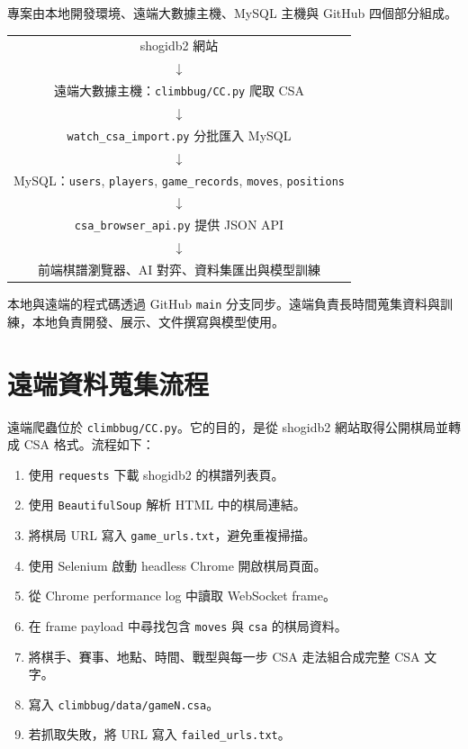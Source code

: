 \documentclass[12pt,a4paper,fontset=none]{ctexart}
\begin{document}
專案由本地開發環境、遠端大數據主機、MySQL 主機與 GitHub 四個部分組成。

\begin{center}
\begin{tabular}{c}
shogidb2 網站 \\
$\downarrow$ \\
遠端大數據主機：\texttt{climbbug/CC.py} 爬取 CSA \\
$\downarrow$ \\
\texttt{watch\_csa\_import.py} 分批匯入 MySQL \\
$\downarrow$ \\
MySQL：\texttt{users}, \texttt{players}, \texttt{game\_records}, \texttt{moves}, \texttt{positions} \\
$\downarrow$ \\
\texttt{csa\_browser\_api.py} 提供 JSON API \\
$\downarrow$ \\
前端棋譜瀏覽器、AI 對弈、資料集匯出與模型訓練
\end{tabular}
\end{center}

本地與遠端的程式碼透過 GitHub \texttt{main} 分支同步。遠端負責長時間蒐集資料與訓練，本地負責開發、展示、文件撰寫與模型使用。

\section{遠端資料蒐集流程}

遠端爬蟲位於 \texttt{climbbug/CC.py}。它的目的，是從 shogidb2 網站取得公開棋局並轉成 CSA 格式。流程如下：

\begin{enumerate}
  \item 使用 \texttt{requests} 下載 shogidb2 的棋譜列表頁。
  \item 使用 \texttt{BeautifulSoup} 解析 HTML 中的棋局連結。
  \item 將棋局 URL 寫入 \texttt{game\_urls.txt}，避免重複掃描。
  \item 使用 Selenium 啟動 headless Chrome 開啟棋局頁面。
  \item 從 Chrome performance log 中讀取 WebSocket frame。
  \item 在 frame payload 中尋找包含 \texttt{moves} 與 \texttt{csa} 的棋局資料。
  \item 將棋手、賽事、地點、時間、戰型與每一步 CSA 走法組合成完整 CSA 文字。
  \item 寫入 \texttt{climbbug/data/gameN.csa}。
  \item 若抓取失敗，將 URL 寫入 \texttt{failed\_urls.txt}。
\end{enumerate}
\end{document}
